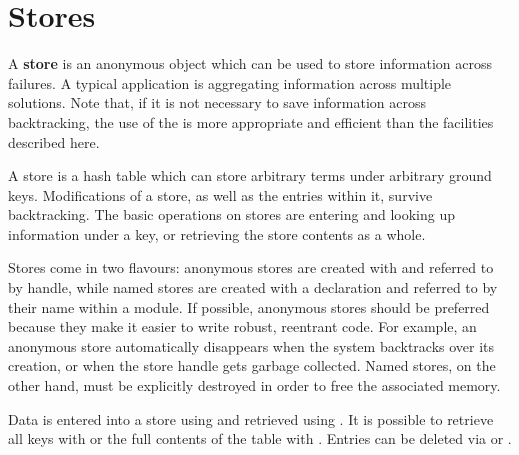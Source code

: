 \section{Stores}

A {\bf store} is an anonymous object which can be used to store information
across failures.  A typical application is aggregating information across
multiple solutions.  Note that, if it is not necessary to save information
across backtracking, the use of the
is more appropriate and efficient than the facilities described here.

A store is a hash table which can store arbitrary terms under arbitrary
ground keys. Modifications of a store, as well as the entries within it,
survive backtracking.  The basic operations on stores are entering and
looking up information under a key, or retrieving the store contents as
a whole.

Stores come in two flavours:  anonymous stores are created with
and referred to by handle, while named stores are created with a
declaration and referred to by their name within a module. 
If possible, anonymous stores should be preferred because they make it
easier to write robust, reentrant code.  For example, an anonymous store
automatically disappears when the system backtracks over its creation,
or when the store handle gets garbage collected.  Named stores, on the
other hand, must be explicitly destroyed in order to free the
associated memory. 

Data is entered into a store using
and retrieved using
.
It is possible to retrieve all keys with
or the full contents of the table with
.
Entries can be deleted via
 or
.

